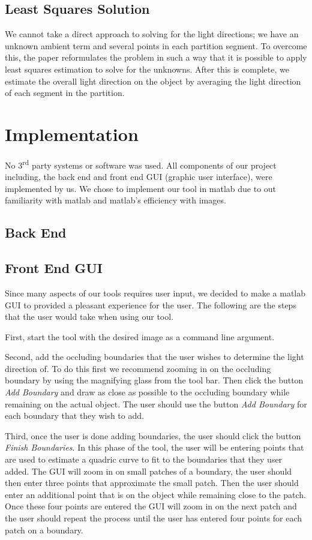 \documentclass[10pt,twocolumn,letterpaper]{article}
\begin{document}
\subsection{Least Squares Solution}
We cannot take a direct approach to solving for the light directions; we have an unknown ambient term and several points in each partition segment. To overcome this, the paper reformulates the problem in such a way that it is possible to apply least squares estimation to solve for the unknowns. After this is complete, we estimate the overall light direction on the object by averaging the light direction of each segment in the partition.


\section{Implementation}

No 3\textsuperscript{rd} party systems or software was used. All components of our project including, the back end and front end GUI (graphic user interface), were implemented by us. We chose to implement our tool in matlab due to out familiarity with matlab and matlab's efficiency with images.

\subsection{Back End}

\subsection{Front End GUI}
Since many aspects of our tools requires user input, we decided to make a matlab GUI to provided a pleasant experience for the user. The following are the steps that the user would take when using our tool. 

First, start the tool with the desired image as a command line argument. 

Second, add the occluding boundaries that the user wishes to determine the light direction of. To do this first we recommend zooming in on the occluding boundary by using the magnifying glass from the tool bar. Then click the button \emph{Add Boundary} and draw as close as possible to the occluding boundary while remaining on the actual object. The user should use the button \emph{Add Boundary} for each boundary that they wish to add. 

Third, once the user is done adding boundaries, the user should click the button \emph{Finish Boundaries}. In this phase of the tool, the user will be entering points that are used to estimate a quadric curve to fit to the boundaries that they user added. The GUI will zoom in on small patches of a boundary, the user should then enter three points that approximate the small patch. Then the user should enter an additional point that is on the object while remaining close to the patch. Once these four points are entered the GUI will zoom in on the next patch and the user should repeat the process until the user has entered four points for each patch on a boundary. 
\end{document}
